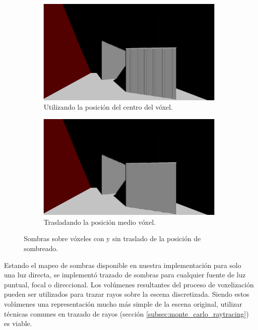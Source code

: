 \begin{figure}[H]
	\centering
	\begin{subfigure}[t]{0.49\textwidth}
		\centering
		\captionsetup{justification=centering}
		\includegraphics[width=\linewidth]{media/no_translation.png}
		\caption*{Utilizando la posición del centro del vóxel.}
	\end{subfigure}%
	\hspace{0.01\textwidth}
	\begin{subfigure}[t]{0.49\textwidth}
		\centering
		\captionsetup{justification=centering}
		\includegraphics[width=\linewidth]{media/with_translation.png}
		\caption*{Trasladando la posición medio vóxel.}
	\end{subfigure}%
	\caption{Sombras sobre vóxeles con y sin traslado de la posición de sombreado.}
	\label{fig:voxel_shadow_translate}
\end{figure}

Estando el mapeo de sombras disponible en nuestra implementación para solo una luz directa, se implementó trazado de sombras para cualquier fuente de luz puntual, focal o direccional. Los volúmenes resultantes del proceso de voxelización pueden ser utilizados para trazar rayos sobre la escena discretizada. Siendo estos volúmenes una representación mucho más simple de la escena original, utilizar técnicas comunes en trazado de rayos (sección \ref{subsec:monte_carlo_raytracing}) es viable.

